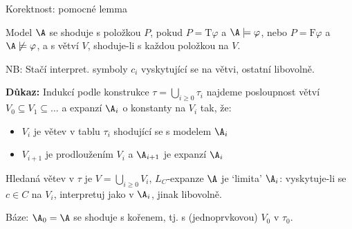 \documentclass{beamer}
\begin{document}
\begin{frame}{Korektnost: pomocné lemma}

    \pause
    \vspace{-6pt}
    Model $\A$ se \alert{shoduje} \alert{s položkou $P$}, pokud
    $P=\mathrm{T}\varphi$ a $\A\models\varphi$, nebo $P=\mathrm{F}\varphi$ a $\A\not\models\varphi$, a \alert{s větví $V$}, shoduje-li s každou položkou na $V$.
    
    \smallskip

    \pause
    
    \pause
    {\small NB: Stačí interpret. symboly $c_i$ vyskytující se na větvi, ostatní libovolně.}
   
    \pause
    \textbf{Důkaz:} \pause
    Indukcí podle konstrukce $\tau=\bigcup_{i\geq 0}\tau_i$ najdeme  posloupnost větví $V_0\subseteq V_1\subseteq\dots$ a expanzí $\A_i$ o konstanty na $V_i$ tak, že:\pause
     \begin{itemize}
        \item $V_i$ je větev v tablu $\tau_i$ shodující se s modelem $\A_i$\pause
        \item $V_{i+1}$ je prodloužením $V_i$ a $\A_{i+1}$ je expanzí $\A_i$\pause
     \end{itemize}
    Hledaná větev v $\tau$ je $V=\bigcup_{i\geq 0}V_i$, $L_C$-expanze $\A$ je `limita' $\A_i$: vyskytuje-li se $c\in C$ na $V_i$, interpretuj jako v $\A_i$, jinak libovolně.\pause

    \alert{Báze:} $\A_0=\A$ se shoduje s kořenem, tj. s (jednoprvkovou) $V_0$ v $\tau_0$.

\end{frame}
\end{document}
